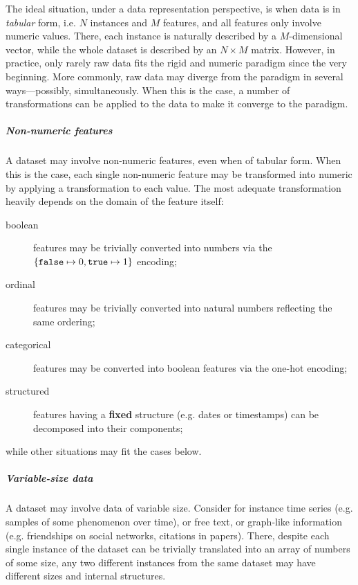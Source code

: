 \documentclass[12pt,a4paper,openright,twoside]{book}
\begin{document}
The ideal situation, under a data representation perspective, is when data is in \emph{tabular} form, i.e. $N$ instances and $M$ features, and all features only involve numeric values.
%
There, each instance is naturally described by a $M$-dimensional vector, while the whole dataset is described by an $N \times M$ matrix.
%
However, in practice, only rarely raw data fits the rigid and numeric paradigm since the very beginning.
%
More commonly, raw data may diverge from the paradigm in several ways---possibly, simultaneously.
%
When this is the case, a number of transformations can be applied to the data to make it converge to the paradigm.

\subparagraph{Non-numeric features}

A dataset may involve non-numeric features, even when of tabular form.
%
When this is the case, each single non-numeric feature may be transformed into numeric by applying a transformation to each value.
%
The most adequate transformation heavily depends on the domain of the feature itself:
%
\begin{description}
    \item[boolean] features may be trivially converted into numbers via the $\{ \mathtt{false} \mapsto 0, \mathtt{true} \mapsto 1 \}$ encoding;

    \item[ordinal] features may be trivially converted into natural numbers reflecting the same ordering;

    \item[categorical] features may be converted into boolean features via the one-hot encoding\footnotemark;

    \item[structured] features having a \textbf{fixed} structure (e.g. dates or timestamps) can be decomposed into their components;
\end{description}
%
while other situations may fit the cases below.


\subparagraph{Variable-size data}

A dataset may involve data of variable size.
%
Consider for instance time series (e.g. samples of some phenomenon over time), or free text, or graph-like information (e.g. friendships on social networks, citations in papers).
%
There, despite each single instance of the dataset can be trivially translated into an array of numbers of some size, any two different instances from the same dataset may have different sizes and internal structures.
\end{document}
